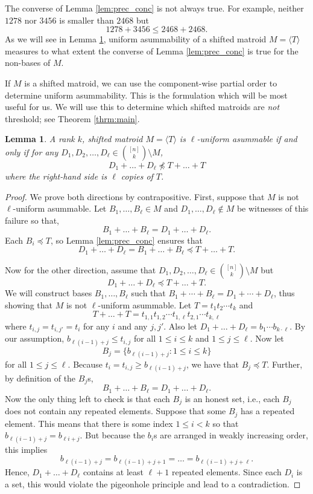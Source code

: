\documentclass{amsart}
\theoremstyle{definition}
\theoremstyle{plain}
\newtheorem{lemma}[defn]{Lemma}
\begin{document}
The converse of Lemma \ref{lem:prec_conc} is not always true. For example, neither $1278$ nor $3456$ is smaller than $2468$ but
\[1278 +  3456 \leq 2468 + 2468. \]
As we will see in Lemma \ref{lem:robust_leq}, uniform asummability of a shifted matroid $M=\langle T \rangle$ measures to what extent the converse of Lemma \ref{lem:prec_conc} is true for the non-bases of $M$.

If $M$ is a shifted matroid, we can use the component-wise partial order to determine uniform asummability. This is the formulation which will be most useful for us. We will use this to determine which shifted matroids are \emph{not} threshold; see Theorem \ref{thrm:main}.

\begin{lemma}\label{lem:robust_leq}
  A rank $k$, shifted matroid $M=\langle T\rangle$ is $\ell$-uniform asummable if and only if for any $D_1,D_2,\ldots, D_\ell\in \binom{[n]}{k}\setminus M$,
  \[D_1+ \ldots + D_\ell \npreceq T+ \ldots + T \]
  where the right-hand side is $\ell$ copies of $T$.
\end{lemma}
\begin{proof}
  We prove both directions by contrapositive. First, suppose that $M$ is not $\ell$-uniform asummable. Let $B_1,\ldots,B_\ell\in M$ and $D_1,\ldots,D_\ell\not\in M$ be witnesses of this failure so that, 
  \[B_1+\ldots+B_\ell = D_1+\ldots+D_\ell. \]
  Each $B_i\preceq T$, so Lemma \ref{lem:prec_conc} ensures that 
  \[D_1+ \ldots + D_\ell = B_1+ \ldots + B_\ell \preceq T+ \ldots + T. \]
  
  \noindent Now for the other direction, assume that $D_1,D_2,\ldots, D_\ell \in \binom{[n]}{k}\setminus M$ but 
    \[ D_1+ \ldots + D_\ell  \preceq T+ \ldots + T. \]
   We will construct bases $B_1,\ldots, B_\ell$ such that $B_1+\cdots + B_\ell = D_1+ \cdots + D_\ell$, thus showing that $M$ is not $\ell$-uniform asummable. Let $T= t_1 t_2 \cdots t_k$ and 
   \[T+\ldots + T = t_{1,1}t_{1,2}\cdots t_{1,\ell}t_{2,1}\cdots t_{k,\ell}\]
    where $t_{i,j}=t_{i,j'}=t_i$ for any $i$ and any $j,j'$. Also let $D_1+\ldots + D_\ell = b_{1}\cdots b_{k\cdot\ell}$. By our assumption, $b_{\ell (i-1) + j}\leq t_{i,j}$ for all $1\leq i\leq k$ and $1\leq j \leq \ell$. Now let
    \[ B_j = \{ b_{\ell (i-1) + j}: 1\leq i \leq k\}\]
    for all $1\leq j \leq \ell$. Because $t_i=t_{i,j}\geq  b_{\ell (i-1) + j}$, we have that $B_j\preceq T$. Further, by definition of the $B_j$s,
    \[B_1+\ldots + B_\ell = D_1+\ldots +D_\ell.\]
    Now the only thing left to check is that each $B_j$ is an honest set, i.e., each $B_{j}$ does not contain any repeated elements. Suppose that some $B_j$ has a repeated element. This means that there is some index $1\leq i < k$ so that $b_{\ell (i-1) +j} = b_{\ell i +j}$. But because the $b_i$s are arranged in weakly increasing order, this implies
    \[b_{\ell(i-1)+j} = b_{\ell(i-1)+j+1} = \ldots = b_{\ell(i-1)+j+\ell}. \]
    Hence, $D_1+\ldots+ D_\ell$ contains at least $\ell+1$ repeated elements. Since each $D_i$ is a set, this would violate the pigeonhole principle and lead to a contradiction.
\end{proof}
\end{document}

